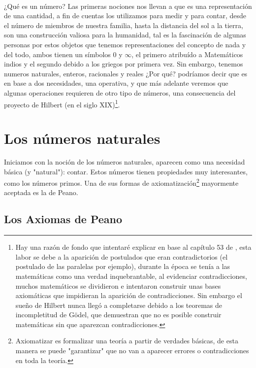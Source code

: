 \documentclass{article}
\begin{document}
\paragraph{} ¿Qué es un número? Las primeras nociones nos llevan a que es una representación de una cantidad, a fin de cuentas los utilizamos para medir y para contar, desde el número de miembros de nuestra familia, hasta la distancia del sol a la tierra, son una construcción valiosa para la humanidad, tal es la fascinación de algunas personas por estos objetos que tenemos representaciones del concepto de nada y del todo, ambos tienen un símbolos 0 y $\infty$, el primero atribuído a Matemáticos indios y el segundo debido a los griegos por primera vez. Sin embargo, tenemos numeros naturales, enteros, racionales y reales ¿Por qué? podríamos decir que es en base a dos necesidades, una operativa, y que más adelante veremos que algunas operaciones requieren de otro tipo de números, una consecuencia del proyecto de Hilbert (en el siglo XIX)\footnote{Hay una razón de fondo que intentaré explicar en base al capítulo 53 de \cite{morris_kline_pensamiento_1972}, esta labor se debe a la aparición de postulados que eran contradictorios (el postulado de las paralelas por ejemplo), durante la época se tenía a las matemáticas como una verdad inquebrantable, al evidenciar contradicciones, muchos matemáticos se dividieron e intentaron construir unas bases axiomáticas que impidieran la aparición de contradicciones. Sin embargo el sueño de Hilbert nunca llegó a completarse debido a los teoremas de incompletitud de Gödel, que demuestran que no es posible construir matemáticas sin que aparezcan contradicciones.
}.

\section{Los números naturales}
Iniciamos con la noción de los números naturales, aparecen como una necesidad básica (y "natural"): contar. Estos números tienen propiedades muy interesantes, como los números primos. Una de sus formas de axiomatización\footnote{Axiomatizar es formalizar una teoría a partir de verdades básicas, de esta manera se puede "garantizar" que no van a aparecer errores o contradicciones en toda la teoría.} mayormente aceptada es la de Peano.

\subsection{Los Axiomas de Peano}
\end{document}
